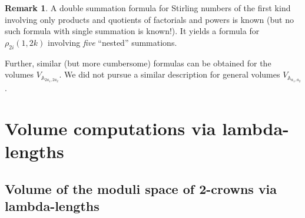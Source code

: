 \documentclass{amsart}
\renewcommand{\AA}{\mathbb{A}}
\theoremstyle{definition}
\newtheorem{remark}[proposition]{Remark}
\begin{document}
\begin{remark}
A double summation formula \cite[Equation~5.7a]{MR460128} for Stirling numbers of the first kind involving only products and quotients of factorials and powers is known (but no such formula with single summation is known!). It yields a formula for $\rho_{2i}(1,2k)$ involving \textit{five} ``nested'' summations.

Further, similar (but more cumbersome) formulas can be obtained for the volumes $V_{\AA_{2a_1,2a_2}}$. We did not pursue a similar description for general volumes $V_{\AA_{a_1,a_2}}$. 
\end{remark}


\newpage
\appendix



\newpage

\section{Volume computations via lambda-lengths}

\subsection{Volume of the moduli space of 2-crowns via lambda-lengths}
\label{app:2-crowns}
\end{document}
